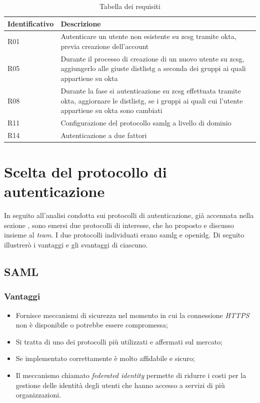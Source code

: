 \begin{center}
    \begin{table}[h]
    \def\arraystretch{2}
    \begin{tabular}{| p{3cm} | p{9cm} |} %
        \hline
        \textbf{Identificativo} & \textbf{Descrizione} \\ \hline  
        R01 & Autenticare un utente non esistente su \gls{zcsg} tramite \gls{okta}, previa creazione dell'account\\ \hline
        R05 & Durante il processo di creazione di un nuovo utente su \gls{zcsg}, aggiungerlo alle giuste \gls{distlistg} a seconda dei gruppi ai quali appartiene su \gls{okta}\\ \hline
        R08 & Durante la fase si autenticazione su \gls{zcsg} effettuata tramite \gls{okta}, aggiornare le \gls{distlistg}, se i gruppi ai quali cui l'utente appartiene su \gls{okta} sono cambiati\\ \hline
        R11 & Configurazione del protocollo \gls{samlg} a livello di dominio\\ \hline
        R14 & Autenticazione a due fattori\\ \hline 
    \end{tabular}
    \caption{Tabella dei requisiti}
    \end{table}
\end{center}
\newpage

\section{Scelta del protocollo di autenticazione}
In seguito all'analisi condotta sui protocolli di autenticazione, già accennata nella sezione , sono emersi due protocolli di interesse, che ho proposto e discusso insieme al \textit{team}.
I due protocolli individuati erano \gls{samlg} e \gls{openidg}. Di seguito illustrerò i vantaggi e gli svantaggi di ciascuno.

\subsection{SAML}
    \subsubsection{Vantaggi}
    \begin{itemize}
        \item Fornisce meccanismi di sicurezza nel momento in cui la connessione \textit{HTTPS} non è disponibile o potrebbe essere compromessa;
        \item Si tratta di uno dei protocolli più utilizzati e affermati sul mercato;
        \item Se implementato correttamente è molto affidabile e sicuro;
        \item Il meccanismo chiamato \textit{federated identity} permette di ridurre i costi per la gestione delle identità degli utenti che hanno accesso a servizi di più organizzazioni.
    \end{itemize}
